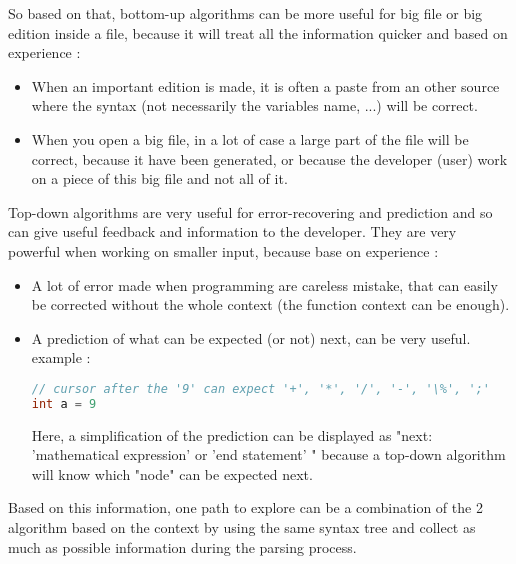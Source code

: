 So based on that, bottom-up algorithms can be more useful for big file or big edition inside a file, because it will treat all the information quicker and based on experience :
\begin{itemize}
\item When an important edition is made, it is often a paste from an other source where the syntax (not necessarily the variables name, ...) will be correct.
\item When you open a big file, in a lot of case a large part of the file will be correct, because it have been generated, or because the developer (user) work on a piece of this big file and not all of it.
\end{itemize}

Top-down algorithms are very useful for error-recovering and prediction and so can give useful feedback and information to the developer. They are very powerful when working on smaller input, because base on experience :
\begin{itemize}
\item A lot of error made when programming are careless mistake, that can easily be corrected without the whole context (the function context can be enough).
\item A prediction of what can be expected (or not) next, can be very useful.
\\ example :
\begin{lstlisting}[language=C++, caption=simple prediction example in C]
// cursor after the '9' can expect '+', '*', '/', '-', '\%', ';'
int a = 9 
\end{lstlisting}
Here, a simplification of the prediction can be displayed as "next: 'mathematical expression' or 'end statement' " because a top-down algorithm will know which "node" can be expected next.
\end{itemize}
Based on this information, one path to explore can be a combination of the 2 algorithm based on the context by using the same syntax tree and collect as much as possible information during the parsing process.